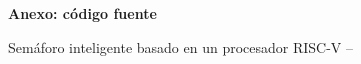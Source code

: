\documentclass[11pt,letterpaper]{article}
\begin{document}
\begin{center}
  {\Large \textbf{Anexo: código fuente}\par}
  \vspace{0.2cm}
  {\large Semáforo inteligente basado en un procesador RISC-V -- \materia\par}
\end{center}
\tableofcontents
\appendix

\end{document}
